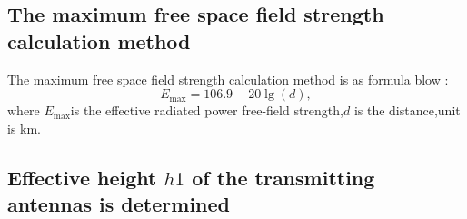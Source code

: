\documentclass[runningheads,a4paper]{llncs}
\begin{document}
\subsection{The maximum free space field strength calculation method}

The maximum free space field strength calculation method is as formula blow
: \begin{equation}
{E_{\max }} = 106.9 - 20\lg (d), \label{keurough} \end{equation} where
${E_{\max }} $is the effective radiated power free-field strength,$d$ is the distance,unit is km.

\subsection{Effective height $h1$ of the transmitting antennas is determined}
\end{document}
